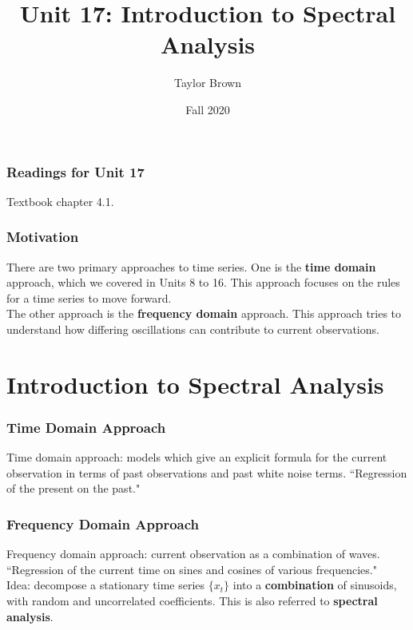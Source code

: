 \documentclass[%
xcolor=pdftex]{beamer}
\title{Unit 17: Introduction to Spectral Analysis}
\author[STAT 5170: Applied Time Series, Unit 17]{Taylor Brown}
\institute{Department of Statistics, University of Virginia}
\date{Fall 2020}
\begin{document}
\frame{\titlepage}


\begin{frame}
\frametitle{Readings for Unit 17}

Textbook chapter 4.1.

\end{frame}




\begin{frame}
\frametitle{Motivation}

There are two primary approaches to time series.  One is the \textbf{time domain} approach, which we covered in Units 8 to 16.  This approach focuses on the rules for a time series to move forward.\\
\vspace{5mm}
The other approach is the \textbf{frequency domain} approach.  This approach tries to understand how differing oscillations can contribute to current observations.

\end{frame}

\section{Introduction to Spectral Analysis}
\frame{\tableofcontents[currentsection]}

\begin{frame}
\frametitle{Time Domain Approach}

Time domain approach: models which give an explicit formula for the current observation in terms of past observations and past white noise terms. ``Regression of the present on the past."

\end{frame}

\begin{frame}
\frametitle{Frequency Domain Approach}

Frequency domain approach: current observation as a combination of waves.  ``Regression of the current  time on sines and cosines of various frequencies."\\
\vspace{5mm}
Idea: decompose a stationary time series $\{x_t\}$ into a \textbf{combination} of sinusoids, with random and uncorrelated coefficients. This is also referred to \textbf{spectral analysis}.


\end{frame}
\end{document}
